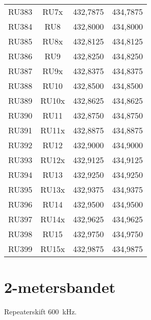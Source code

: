 \begin{tabular}{ r | c | l | l }
	RU383 & RU7x  & 432,7875       & 434,7875       \\
	RU384 & RU8   & 432,8000       & 434,8000       \\
	RU385 & RU8x  & 432,8125       & 434,8125       \\
	RU386 & RU9   & 432,8250       & 434,8250       \\
	RU387 & RU9x  & 432,8375       & 434,8375       \\
	RU388 & RU10  & 432,8500       & 434,8500       \\
	RU389 & RU10x & 432,8625       & 434,8625       \\
	RU390 & RU11  & 432,8750       & 434,8750       \\
	RU391 & RU11x & 432,8875       & 434,8875       \\
	RU392 & RU12  & 432,9000       & 434,9000       \\
	RU393 & RU12x & 432,9125       & 434,9125       \\
	RU394 & RU13  & 432,9250       & 434,9250       \\
	RU395 & RU13x & 432,9375       & 434,9375       \\
	RU396 & RU14  & 432,9500       & 434,9500       \\
	RU397 & RU14x & 432,9625       & 434,9625       \\
	RU398 & RU15  & 432,9750       & 434,9750       \\
	RU399 & RU15x & 432,9875       & 434,9875       \\
\end{tabular}

\newpage

\section{2-metersbandet}
Repeaterskift \SI{600}{\kilo\hertz}.

